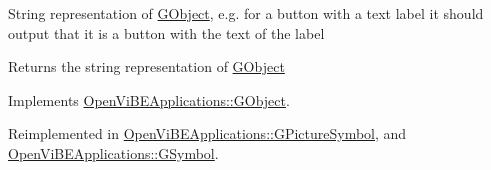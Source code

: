 \label{classOpenViBEApplications_1_1GLabel_a562a8811832fa57cd0b5ae48467ed687}
String representation of \hyperlink{classOpenViBEApplications_1_1GObject}{GObject}, e.g. for a button with a text label it should output that it is a button with the text of the label \begin{DoxyReturn}{Returns}
the string representation of \hyperlink{classOpenViBEApplications_1_1GObject}{GObject} 
\end{DoxyReturn}


Implements \hyperlink{classOpenViBEApplications_1_1GObject_a4b50dbc5c1db8346461892dcdd53db86}{OpenViBEApplications::GObject}.



Reimplemented in \hyperlink{classOpenViBEApplications_1_1GPictureSymbol_a1dcff61ca3a281b9ff86f90761a6dc2f}{OpenViBEApplications::GPictureSymbol}, and \hyperlink{classOpenViBEApplications_1_1GSymbol_afec3806bc335de92b23d072f64faa56e}{OpenViBEApplications::GSymbol}.



